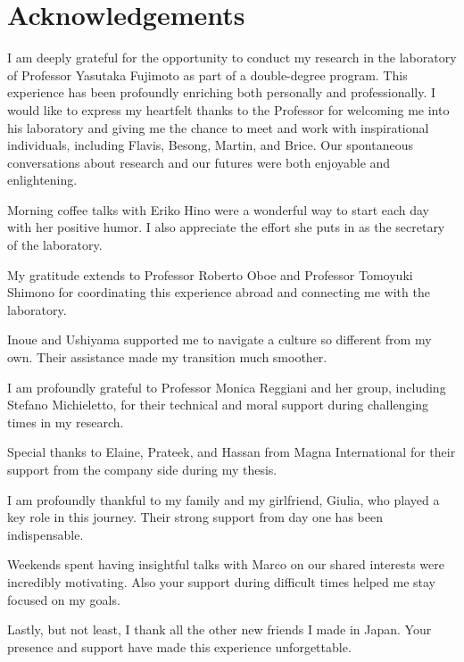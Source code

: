 \thispagestyle{empty}
\section*{Acknowledgements}
\vspace{0.5cm}
I am deeply grateful for the opportunity to conduct my research in the laboratory 
of Professor Yasutaka Fujimoto as part of a double-degree program. This experience 
has been profoundly enriching both personally and professionally. I would like 
to express my heartfelt thanks to the Professor for welcoming me into his laboratory and 
giving me the chance to meet and work with inspirational individuals, including 
Flavis, Besong, Martin, and Brice. Our spontaneous conversations about research 
and our futures were both enjoyable and enlightening.

Morning coffee talks with Eriko Hino were a wonderful way to start each day with 
her positive humor. I also appreciate the effort she puts in as the secretary of 
the laboratory.

My gratitude extends to Professor Roberto Oboe and Professor Tomoyuki Shimono 
for coordinating this experience abroad and connecting me with the laboratory.

Inoue and Ushiyama supported me to navigate a culture so different 
from my own. Their assistance made my transition much smoother.

I am profoundly grateful to Professor Monica Reggiani and her group, including 
Stefano Michieletto, for their technical and moral support during 
challenging times in my research.

Special thanks to Elaine, Prateek, and Hassan from Magna International for their 
support from the company side during my thesis.

I am profoundly thankful to my family and my girlfriend, Giulia, who played a 
key role in this journey. Their strong support from day one has been indispensable.

Weekends spent having insightful talks with Marco on our shared interests were 
incredibly motivating. Also your support during difficult times helped me stay 
focused on my goals.

Lastly, but not least, I thank all the other new friends I made in Japan. Your 
presence and support have made this experience unforgettable.
\afterpage{\blankpage}